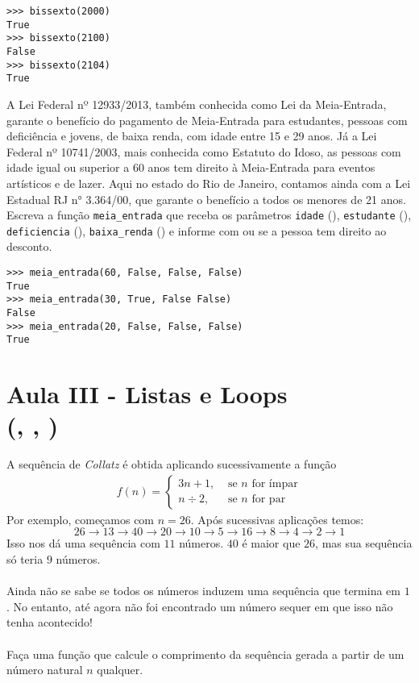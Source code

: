 \documentclass[12pt]{article}
\begin{document}
	\example
	\begin{lstlisting}
>>> bissexto(2000)
True
>>> bissexto(2100)
False
>>> bissexto(2104)
True
	\end{lstlisting}
	
	\pagebreak
	
	
	A Lei Federal nº 12933/2013, também conhecida como Lei da Meia-Entrada, garante o benefício do pagamento de Meia-Entrada para estudantes, pessoas com deficiência e jovens, de baixa renda, com idade entre 15 e 29 anos. Já a Lei Federal nº 10741/2003, mais conhecida como Estatuto do Idoso, as pessoas com idade igual ou superior a 60 anos tem direito à Meia-Entrada para eventos artísticos e de lazer. Aqui no estado do Rio de Janeiro, contamos ainda com a Lei Estadual RJ n° 3.364/00, que garante o benefício a todos os menores de 21 anos.\\
	
	\quest Escreva a função \texttt{meia\_entrada} que receba os parâmetros \texttt{idade} (), \texttt{estudante} (), \texttt{deficiencia} (), \texttt{baixa\_renda} () e informe com  ou  se a pessoa tem direito ao desconto.\\
	
	\example
	\begin{lstlisting}
>>> meia_entrada(60, False, False, False)
True
>>> meia_entrada(30, True, False False)
False
>>> meia_entrada(20, False, False, False)
True
	\end{lstlisting}
	
	\pagebreak
	
	\section{Aula III - Listas e Loops \\(, , )}
	
	
	A sequência de \emph{Collatz} é obtida aplicando sucessivamente a função
	{\large
		\begin{align*}
		f(n) = \begin{cases}
		3n + 1, &\text{ se } n \text{ for ímpar}\\
		n \div 2, &\text{ se } n \text{ for par}
		\end{cases}
		\end{align*}
	}
	Por exemplo, começamos com $n = 26$. Após sucessivas aplicações temos:
	$$26 \to 13 \to 40 \to 20 \to 10 \to 5 \to 16 \to 8 \to 4 \to 2 \to 1$$
	Isso nos dá uma sequência com $11$ números. $40$ é maior que $26$, mas sua sequência só teria $9$ números.\\
	\\
	Ainda não se sabe se todos os números induzem uma sequência que termina em $1$. No entanto, até agora não foi encontrado um número sequer em que isso não tenha acontecido!\\
	\\
	\quest Faça uma função que calcule o comprimento da sequência gerada a partir de um número natural $n$ qualquer.\\
	
\end{document}
